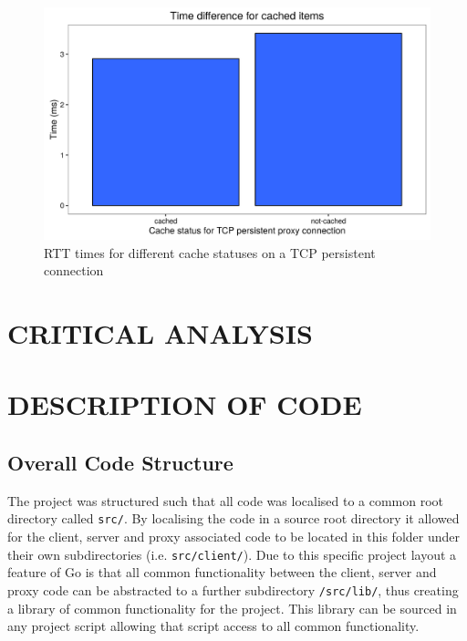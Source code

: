 \documentclass[10pt,twocolumn]{witseiepaper}
\begin{document}
		\begin{figure}[htbp]
			\centering
			\includegraphics[width=\columnwidth]{resources/RTT_cache.png}
			\caption{RTT times for different cache statuses on a TCP persistent connection}
			\label{fig:rtt_cache}
		\end{figure}


\section{CRITICAL ANALYSIS}


\section{DESCRIPTION OF CODE}

	\subsection{Overall Code Structure}

		The project was structured such that all code was localised to a common root directory called \texttt{src/}. By localising the code in a source root directory it allowed for the client, server and proxy associated code to be located in this folder under their own subdirectories (i.e. \texttt{src/client/}). Due to this specific project layout a feature of Go is that all common functionality between the client, server and proxy code can be abstracted to a further subdirectory \texttt{/src/lib/}, thus creating a library of common functionality for the project. This library can be sourced in any project script allowing that script access to all common functionality.\\
		
\end{document}
